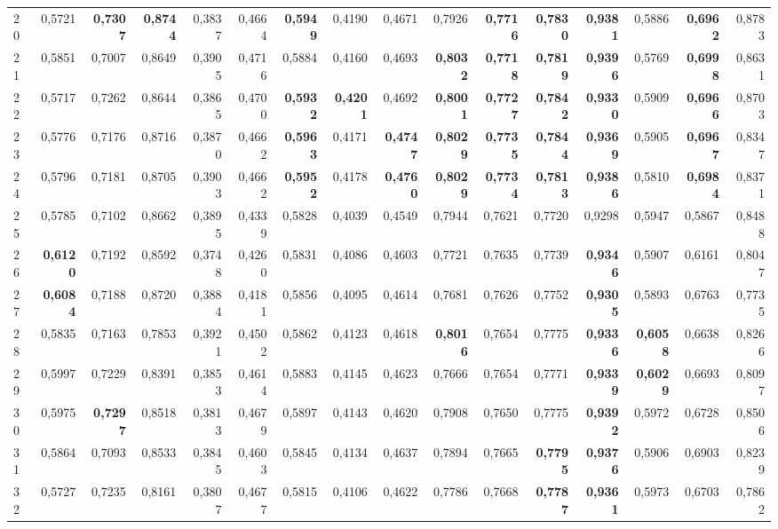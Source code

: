 \begin{table}[htp!]
\begin{adjustwidth}{-2cm}{}
\begin{tabular}{ l | *{15}{| r}}
20	&	0,5721	&	\textbf{0,7307}	&	\textbf{0,8744}	&	0,3837	&	0,4664	&	\textbf{0,5949}	&	0,4190	&	0,4671	&	0,7926	&	\textbf{0,7716}	&	\textbf{0,7830}	&	\textbf{0,9381}	&	0,5886	&	\textbf{0,6962}	&	0,8783	\\
21	&	0,5851	&	0,7007	&	0,8649	&	0,3905	&	0,4716	&	0,5884	&	0,4160	&	0,4693	&	\textbf{0,8032}	&	\textbf{0,7718}	&	\textbf{0,7819}	&	\textbf{0,9396}	&	0,5769	&	\textbf{0,6998}	&	0,8631	\\
22	&	0,5717	&	0,7262	&	0,8644	&	0,3865	&	0,4700	&	\textbf{0,5932}	&	\textbf{0,4201}	&	0,4692	&	\textbf{0,8001}	&	\textbf{0,7727}	&	\textbf{0,7842}	&	\textbf{0,9330}	&	0,5909	&	\textbf{0,6966}	&	0,8703	\\
23	&	0,5776	&	0,7176	&	0,8716	&	0,3870	&	0,4662	&	\textbf{0,5963}	&	0,4171	&	\textbf{0,4747}	&	\textbf{0,8029}	&	\textbf{0,7735}	&	\textbf{0,7844}	&	\textbf{0,9369}	&	0,5905	&	\textbf{0,6967}	&	0,8347	\\
24	&	0,5796	&	0,7181	&	0,8705	&	0,3903	&	0,4662	&	\textbf{0,5952}	&	0,4178	&	\textbf{0,4760}	&	\textbf{0,8029}	&	\textbf{0,7734}	&	\textbf{0,7813}	&	\textbf{0,9386}	&	0,5810	&	\textbf{0,6984}	&	0,8371	\\
25	&	0,5785	&	0,7102	&	0,8662	&	0,3895	&	0,4339	&	0,5828	&	0,4039	&	0,4549	&	0,7944	&	0,7621	&	0,7720	&	0,9298	&	0,5947	&	0,5867	&	0,8488	\\
26	&	\textbf{0,6120}	&	0,7192	&	0,8592	&	0,3748	&	0,4260	&	0,5831	&	0,4086	&	0,4603	&	0,7721	&	0,7635	&	0,7739	&	\textbf{0,9346}	&	0,5907	&	0,6161	&	0,8047	\\
27	&	\textbf{0,6084}	&	0,7188	&	0,8720	&	0,3884	&	0,4181	&	0,5856	&	0,4095	&	0,4614	&	0,7681	&	0,7626	&	0,7752	&	\textbf{0,9305}	&	0,5893	&	0,6763	&	0,7735	\\
28	&	0,5835	&	0,7163	&	0,7853	&	0,3921	&	0,4502	&	0,5862	&	0,4123	&	0,4618	&	\textbf{0,8016}	&	0,7654	&	0,7775	&	\textbf{0,9336}	&	\textbf{0,6058}	&	0,6638	&	0,8266	\\
29	&	0,5997	&	0,7229	&	0,8391	&	0,3853	&	0,4614	&	0,5883	&	0,4145	&	0,4623	&	0,7666	&	0,7654	&	0,7771	&	\textbf{0,9339}	&	\textbf{0,6029}	&	0,6693	&	0,8097	\\
30	&	0,5975	&	\textbf{0,7297}	&	0,8518	&	0,3813	&	0,4679	&	0,5897	&	0,4143	&	0,4620	&	0,7908	&	0,7650	&	0,7775	&	\textbf{0,9392}	&	0,5972	&	0,6728	&	0,8506	\\
31	&	0,5864	&	0,7093	&	0,8533	&	0,3845	&	0,4603	&	0,5845	&	0,4134	&	0,4637	&	0,7894	&	0,7665	&	\textbf{0,7795}	&	\textbf{0,9376}	&	0,5906	&	0,6903	&	0,8239	\\
32	&	0,5727	&	0,7235	&	0,8161	&	0,3807	&	0,4677	&	0,5815	&	0,4106	&	0,4622	&	0,7786	&	0,7668	&	\textbf{0,7787}	&	\textbf{0,9361}	&	0,5973	&	0,6703	&	0,7862	\\

\end{tabular}
\end{adjustwidth}
\end{table}
